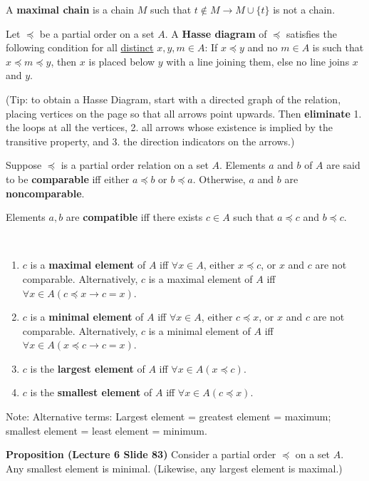 \documentclass{article}
\begin{document}
\begin{description}
	\item[Maximal Chain (Tutorial 10 Q11)]A \textbf{maximal chain} is a chain $M$ such that $t\not\in M\to M\cup \{t\}$ is not a chain.
	\item[Hasse Diagram]Let $\preceq$ be a partial order on a set $A$. A \textbf{Hasse diagram} of $\preceq$ satisfies the following condition for all \underline{distinct} $x,y,m\in A$: If $x\preceq y$ and no $m \in A$ is such that $x\preceq m\preceq y$, then $x$ is placed below $y$ with a line joining them, else no line joins $x$ and $y$.
	\item \qquad (Tip: to obtain a Hasse Diagram, start with a directed graph of the relation, placing vertices on the page so that all arrows point upwards. Then \textbf{eliminate} 1. the loops at all the vertices, 2. all arrows whose existence is implied by the transitive property, and 3. the direction indicators on the arrows.)
	\item[Comparability]Suppose $\preceq$ is a partial order relation on a set $A$. Elements $a$ and $b$ of $A$ are said to be \textbf{comparable} iff either $a\preceq b$ or $b\preceq a$. Otherwise, $a$ and $b$ are \textbf{noncomparable}.
	\item[Compatible (Tutorial 5 Q7)]Elements $a, b$ are \textbf{compatible} iff there exists $c\in A$ such that $a\preceq c$ and $b \preceq c$. 
	\item[Maximal/Minimal/Largest/Smallest Element] \
	\begin{enumerate}
		\item $c$ is a \textbf{maximal element} of $A$ iff $\forall x\in A$, either $x\preceq c$, or $x$ and $c$ are not comparable. Alternatively, $c$ is a maximal element of $A$ iff $\forall x\in A(c\preceq x\to c=x)$.
		\item $c$ is a \textbf{minimal element} of $A$ iff $\forall x\in A$, either $c\preceq x$, or $x$ and $c$ are not comparable. Alternatively, $c$ is a minimal element of $A$ iff $\forall x\in A(x\preceq c\to c=x)$.
		\item $c$ is the \textbf{largest element} of $A$ iff $\forall x\in A(x\preceq c)$.
		\item $c$ is the \textbf{smallest element} of $A$ iff $\forall x\in A(c\preceq x)$.
	\end{enumerate}
	\item \qquad Note: Alternative terms: Largest element = greatest element = maximum; smallest element = least element = minimum.
	\item \qquad \textbf{Proposition (Lecture 6 Slide 83)} Consider a partial order $\preceq$ on a set $A$. Any smallest element is minimal. (Likewise, any largest element is maximal.)

\end{description}
\end{document}
